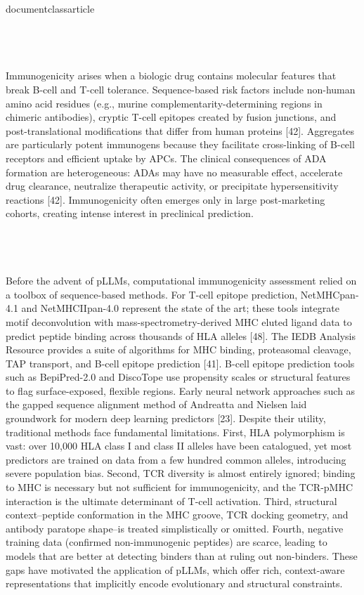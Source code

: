 \\documentclass{article}
\begin{document}
\subsection{}

Immunogenicity arises when a biologic drug contains molecular features that break B-cell and T-cell tolerance. Sequence-based risk factors include non-human amino acid residues (e.g., murine complementarity-determining regions in chimeric antibodies), cryptic T-cell epitopes created by fusion junctions, and post-translational modifications that differ from human proteins [42]. Aggregates are particularly potent immunogens because they facilitate cross-linking of B-cell receptors and efficient uptake by APCs. The clinical consequences of ADA formation are heterogeneous: ADAs may have no measurable effect, accelerate drug clearance, neutralize therapeutic activity, or precipitate hypersensitivity reactions [42]. Immunogenicity often emerges only in large post-marketing cohorts, creating intense interest in preclinical prediction.

\subsection{}

Before the advent of pLLMs, computational immunogenicity assessment relied on a toolbox of sequence-based methods. For T-cell epitope prediction, NetMHCpan-4.1 and NetMHCIIpan-4.0 represent the state of the art; these tools integrate motif deconvolution with mass-spectrometry-derived MHC eluted ligand data to predict peptide binding across thousands of HLA alleles [48]. The IEDB Analysis Resource provides a suite of algorithms for MHC binding, proteasomal cleavage, TAP transport, and B-cell epitope prediction [41]. B-cell epitope prediction tools such as BepiPred-2.0 and DiscoTope use propensity scales or structural features to flag surface-exposed, flexible regions. Early neural network approaches such as the gapped sequence alignment method of Andreatta and Nielsen laid groundwork for modern deep learning predictors [23]. Despite their utility, traditional methods face fundamental limitations. First, HLA polymorphism is vast: over 10,000 HLA class I and class II alleles have been catalogued, yet most predictors are trained on data from a few hundred common alleles, introducing severe population bias. Second, TCR diversity is almost entirely ignored; binding to MHC is necessary but not sufficient for immunogenicity, and the TCR-pMHC interaction is the ultimate determinant of T-cell activation. Third, structural context--peptide conformation in the MHC groove, TCR docking geometry, and antibody paratope shape--is treated simplistically or omitted. Fourth, negative training data (confirmed non-immunogenic peptides) are scarce, leading to models that are better at detecting binders than at ruling out non-binders. These gaps have motivated the application of pLLMs, which offer rich, context-aware representations that implicitly encode evolutionary and structural constraints.
\end{document}
